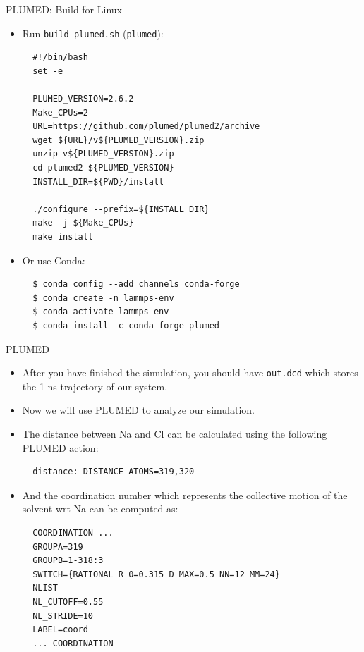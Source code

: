 \documentclass[10pt]{beamer}
\begin{document}
\begin{frame}[fragile]{PLUMED: Build for Linux}
  \begin{itemize}
    \item Run \texttt{build-plumed.sh} (\texttt{plumed}):
    \begin{lstlisting}
  #!/bin/bash
  set -e

  PLUMED_VERSION=2.6.2
  Make_CPUs=2
  URL=https://github.com/plumed/plumed2/archive
  wget ${URL}/v${PLUMED_VERSION}.zip
  unzip v${PLUMED_VERSION}.zip
  cd plumed2-${PLUMED_VERSION}
  INSTALL_DIR=${PWD}/install

  ./configure --prefix=${INSTALL_DIR}
  make -j ${Make_CPUs}
  make install
    \end{lstlisting}

    \item Or use Conda:
    \begin{lstlisting}
  $ conda config --add channels conda-forge
  $ conda create -n lammps-env
  $ conda activate lammps-env
  $ conda install -c conda-forge plumed
    \end{lstlisting}
  \end{itemize}
\end{frame}

\begin{frame}[fragile]{PLUMED}
  \begin{itemize}
    \setlength\itemsep{1em}
    \item After you have finished the simulation, you should have \texttt{out.dcd} which stores the 1-ns trajectory of our system.
    \item Now we will use PLUMED to analyze our simulation.
    \item The distance between Na and Cl can be calculated using the following PLUMED action:
    \begin{lstlisting}
  distance: DISTANCE ATOMS=319,320
    \end{lstlisting}
    \item And the coordination number which represents the collective motion of the solvent wrt Na can be computed as:
    \begin{lstlisting}
  COORDINATION ...
  GROUPA=319
  GROUPB=1-318:3
  SWITCH={RATIONAL R_0=0.315 D_MAX=0.5 NN=12 MM=24}
  NLIST
  NL_CUTOFF=0.55
  NL_STRIDE=10
  LABEL=coord
  ... COORDINATION
    \end{lstlisting}
  \end{itemize}
\end{frame}
\end{document}
